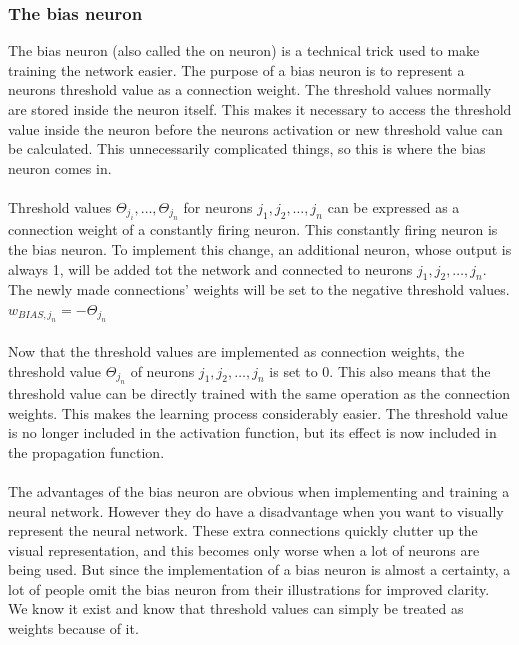 \documentclass[pdftex,a4paper,12pt,twoside]{report}
\theoremstyle{plain} \newtheorem{theorem}{Theorem} \newtheorem{proposition}{Proposition} \newtheorem{lemma}{Lemma} \newtheorem*{corollary}{Corollary}
\theoremstyle{definition} \newtheorem{definition}{Definition} \newtheorem{conjecture}{Conjecture} \newtheorem*{example}{Example} \newtheorem{algorithm}{Algorithm}
\theoremstyle{remark} \newtheorem*{remark}{Remark} \newtheorem*{note}{Note} \newtheorem{case}{Case}
\begin{document}
\subsubsection{The bias neuron}
\label{subsubsec:biasneuron}
The bias neuron (also called the on neuron) is a technical trick used to make training the network easier. The purpose of a bias neuron is to represent a neurons threshold value as a connection weight. The threshold values normally are stored inside the neuron itself. This makes it necessary to access the threshold value inside the neuron before the neurons activation or new threshold value can be calculated. This unnecessarily complicated things, so this is where the bias neuron comes in.\\\\Threshold values $\Theta_{j_{i}}, \dotsc ,\Theta_{j_{n}}$ for neurons $j_1,j_2, \dotsc ,j_n$ can be expressed as a connection weight of a constantly firing neuron. This constantly firing neuron is the bias neuron. To implement this change, an additional neuron, whose output is always 1, will be added tot the network and connected to neurons $j_1,j_2, \dotsc ,j_n$. The newly made connections' weights will be set to the negative threshold values. $w_{BIAS,j_{n}} = - \Theta_{j_{n}}$\\\\Now that the threshold values are implemented as connection weights, the threshold value $\Theta_{j_{n}}$ of neurons $j_1,j_2, \dotsc ,j_n$ is set to 0. This also means that the threshold value can be directly trained with the same operation as the connection weights. This makes the learning process considerably easier. The threshold value is no longer included in the activation function, but its effect is now included in the propagation function.\\\\The advantages of the bias neuron are obvious when implementing and training a neural network. However they do have a disadvantage when you want to visually represent the neural network. These extra connections quickly clutter up the visual representation, and this becomes only worse when a lot of neurons are being used. But since the implementation of a bias neuron is almost a certainty, a lot of people omit the bias neuron from their illustrations for improved clarity. We know it exist and know that threshold values can simply be treated as weights because of it.
\end{document}

